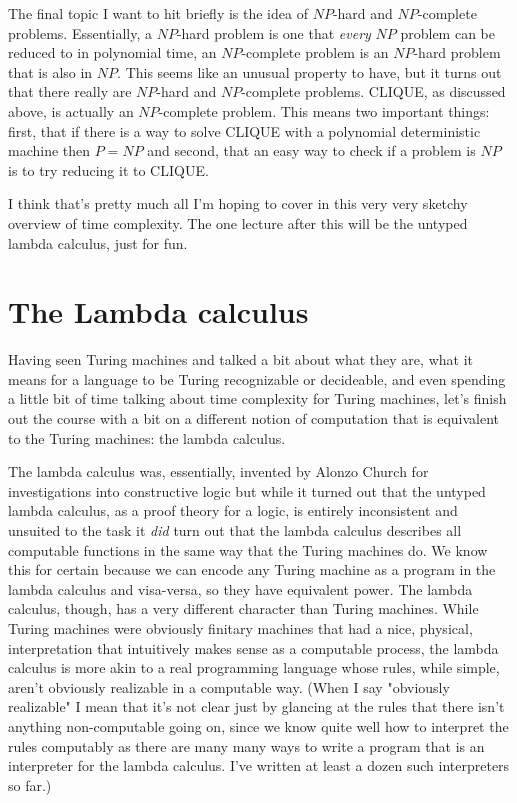 \documentclass[11pt]{article}
\begin{document}
The final topic I want to hit briefly is the idea of $NP$-hard and $NP$-complete problems. Essentially, a $NP$-hard problem is one that \emph{every} $NP$ problem can be reduced to in polynomial time, an $NP$-complete problem is an $NP$-hard problem that is also in $NP$. This seems like an unusual property to have, but it turns out that there really are $NP$-hard and $NP$-complete problems. CLIQUE, as discussed above, is actually an $NP$-complete problem. This means two important things: first, that if there is a way to solve CLIQUE with a polynomial deterministic machine then $P=NP$ and second, that an easy way to check if a problem is $NP$ is to try reducing it to CLIQUE.

I think that's pretty much all I'm hoping to cover in this very very sketchy overview of time complexity. The one lecture after this will be the untyped lambda calculus, just for fun.
\section{The Lambda calculus}
\label{sec-17}
Having seen Turing machines and talked a bit about what they are, what it means for a language to be Turing recognizable or decideable, and even spending a little bit of time talking about time complexity for Turing machines, let's finish out the course with a bit on a different notion of computation that is equivalent to the Turing machines: the lambda calculus.

The lambda calculus was, essentially, invented by Alonzo Church for investigations into constructive logic but while it turned out that the untyped lambda calculus, as a proof theory for a logic, is entirely inconsistent and unsuited to the task it \emph{did} turn out that the lambda calculus describes all computable functions in the same way that the Turing machines do. We know this for certain because we can encode any Turing machine as a program in the lambda calculus and visa-versa, so they have equivalent power. The lambda calculus, though, has a very different character than Turing machines. While Turing machines were obviously finitary machines that had a nice, physical, interpretation that intuitively makes sense as a computable process, the lambda calculus is more akin to a real programming language whose rules, while simple, aren't obviously realizable in a computable way. (When I say "obviously realizable" I mean that it's not clear just by glancing at the rules that there isn't anything non-computable going on, since we know quite well how to interpret the rules computably as there are many many ways to write a program that is an interpreter for the lambda calculus. I've written at least a dozen such interpreters so far.)
\end{document}
